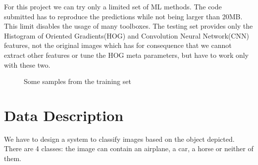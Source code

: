 \documentclass{article} %
\begin{document}
For this project we can try only a limited set of ML methods. The code submitted has to reproduce the predictions while not being larger than 20MB. This limit disables the usage of many toolboxes.
The testing set provides only the Histogram of Oriented Gradients(HOG) and Convolution Neural Network(CNN) features, not the original images which has for consequence that we cannot extract other features or tune the HOG meta parameters, but have to work only with these two.

\begin{figure}[!t]
	\centering
	\caption{Some samples from the training set}
\end{figure}

\section{Data Description}

We have to design a system to classify images based on the object depicted.
There are 4 classes: the image can contain an airplane, a car, a horse or neither of them.
\end{document}
